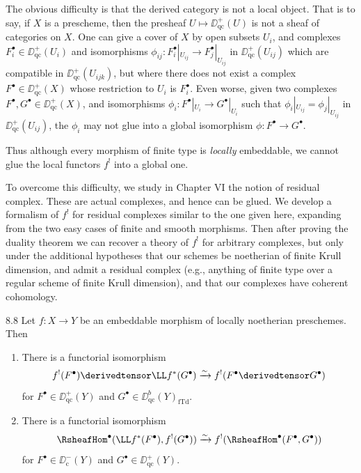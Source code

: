 The obvious difficulty is that the derived category is not a local object. That is to say, if $X$ is a prescheme, then the presheaf $U\mapsto\DD_{\mathrm{qc}}^+(U)$ is not a sheaf of categories on $X$. One can give a cover of $X$ by open subsets $U_i$, and complexes $F_i^\bullet\in\DD_{\mathrm{qc}}^+(U_i)$ and isomorphisms $\phi_{ij}\colon F_i^\bullet|_{U_{ij}}\to F_j^\bullet|_{U_{ij}}$ in $\DD_{\mathrm{qc}}^+(U_{ij})$ which are compatible in $\DD_{\mathrm{qc}}^+(U_{ijk})$, but where there does not exist a complex $F^\bullet\in\DD_{\mathrm{qc}}^+(X)$ whose restriction to $U_i$ is $F_i^\bullet$. Even worse, given two complexes $F^\bullet,G^\bullet\in\DD_{\mathrm{qc}}^+(X)$, and isomorphisms $\phi_i\colon F^\bullet|_{U_i}\to G^\bullet|_{U_i}$ such that $\phi_i|_{U_{ij}}=\phi_j|_{U_{ij}}$ in $\DD_{\mathrm{qc}}^+(U_{ij})$, the $\phi_i$ may not glue into a global isomorphism $\phi\colon F^\bullet\to G^\bullet$.

Thus although every morphism of finite type is \emph{locally} embeddable, we cannot glue the local functors $f^!$ into a global one.

To overcome this difficulty, we study in Chapter VI the notion of residual complex. These are actual complexes, and hence can be glued. We develop a formalism of $f^!$ for residual complexes similar to the one given here, expanding from the two easy cases of finite and smooth morphisms. Then after proving the duality theorem we can recover a theory of $f^!$ for arbitrary complexes, but only under the additional hypotheses that our schemes be noetherian of finite Krull dimension, and admit a residual complex (e.g., anything of finite type over a regular scheme of finite Krull dimension), and that our complexes have coherent cohomology.

\begin{bookproposition}{8.8}\label{prop:3.8.8}
Let $f\colon X\to Y$ be an embeddable morphism of locally noetherian preschemes. Then
\begin{enumerate}
\item[6)] There is a functorial isomorphism
\[
f^!(F^\bullet)\derivedtensor\LL f^*(G^\bullet) \xrightarrow{\sim} f^!(F^\bullet\derivedtensor G^\bullet)
\]
for $F^\bullet\in\DD_{\mathrm{qc}}^+(Y)$ and $G^\bullet\in\DD_{\mathrm{qc}}^b(Y)_{\mathrm{fTd}}$.
\item[7)] There is a functorial isomorphism
\[
\RsheafHom^\bullet(\LL f^*(F^\bullet), f^!(G^\bullet)) \xrightarrow{\sim} f^!(\RsheafHom^\bullet(F^\bullet,G^\bullet))
\]
for $F^\bullet\in\DD_{\mathrm{c}}^-(Y)$ and $G^\bullet\in\DD_{\mathrm{qc}}^+(Y)$.
\end{enumerate}
\end{bookproposition}

